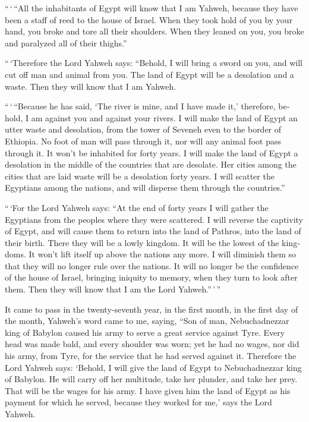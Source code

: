 \begin{paracol}{2}
\begin{otherlanguage}{english}
 ``\,`\,``All the inhabitants of Egypt will know that I am
Yahweh, because they have been a staff of reed to the house of Israel.
 When they took hold of you by your hand, you broke and
tore all their shoulders. When they leaned on you, you broke and
paralyzed all of their thighs.''

 ``\,`Therefore the Lord Yahweh says: ``Behold, I will
bring a sword on you, and will cut off man and animal from you.
 The land of Egypt will be a desolation and a waste. Then
they will know that I am Yahweh.

``\,`\,``Because he has said, `The river is mine, and I have made it,'
 therefore, behold, I am against you and against your
rivers. I will make the land of Egypt an utter waste and desolation,
from the tower of Seveneh even to the border of Ethiopia.
 No foot of man will pass through it, nor will any animal
foot pass through it. It won't be inhabited for forty years.
 I will make the land of Egypt a desolation in the middle
of the countries that are desolate. Her cities among the cities that are
laid waste will be a desolation forty years. I will scatter the
Egyptians among the nations, and will disperse them through the
countries.''

 ``\,`For the Lord Yahweh says: ``At the end of forty
years I will gather the Egyptians from the peoples where they were
scattered.  I will reverse the captivity of Egypt, and
will cause them to return into the land of Pathros, into the land of
their birth. There they will be a lowly kingdom.  It will
be the lowest of the kingdoms. It won't lift itself up above the nations
any more. I will diminish them so that they will no longer rule over the
nations.  It will no longer be the confidence of the
house of Israel, bringing iniquity to memory, when they turn to look
after them. Then they will know that I am the Lord Yahweh.''\,'\,''

 It came to pass in the twenty-seventh year, in the first
month, in the first day of the month, Yahweh's word came to me, saying,
 ``Son of man, Nebuchadnezzar king of Babylon caused his
army to serve a great service against Tyre. Every head was made bald,
and every shoulder was worn; yet he had no wages, nor did his army, from
Tyre, for the service that he had served against it. 
Therefore the Lord Yahweh says: `Behold, I will give the land of Egypt
to Nebuchadnezzar king of Babylon. He will carry off her multitude, take
her plunder, and take her prey. That will be the wages for his army.
 I have given him the land of Egypt as his payment for
which he served, because they worked for me,' says the Lord Yahweh.


\end{otherlanguage}
\end{paracol}
